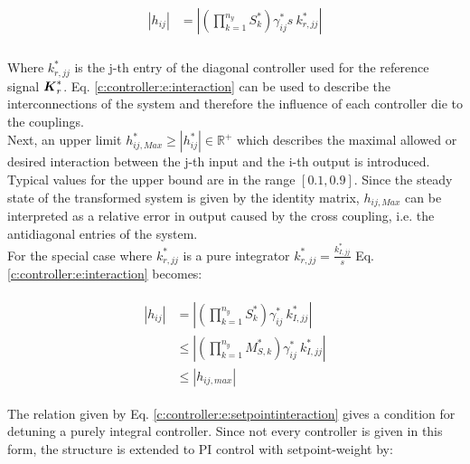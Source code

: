 \begin{align}
\begin{split}
|h_{ij}| &= \left|\left(\prod_{k = 1}^{n_y} S_{k}^*\right)\gamma_{ij}^*s ~k^*_{r,jj} \right| \\
\end{split}
\label{c:controller:e:interaction}
\end{align}

Where $k^*_{r,jj}$ is the j-th entry of the diagonal controller used for the reference signal $\mbox{\boldmath$K$}_r^*$. Eq. \ref{c:controller:e:interaction} can be used to describe the interconnections of the system and therefore the influence of each controller die to the couplings.\\

Next, an upper limit $h_{ij,Max}^* \geq |h_{ij}^*| \in \mathbb{R}^+$ which describes the maximal allowed or desired interaction between the j-th input and the i-th output is introduced. Typical values for the upper bound are in the range $\left[0.1, 0.9\right]$. Since the steady state of the transformed system is given by the identity matrix, $h_{ij,Max}$ can be interpreted as a relative error in output caused by the cross coupling, i.e. the antidiagonal entries of the system. \\

For the special case where $k^*_{r,jj}$ is a pure integrator $k_{r,jj}^* = \frac{k_{I,jj}^*}{s}$ Eq. \ref{c:controller:e:interaction} becomes:

\begin{align}
\begin{split}
\left| h_{ij} \right| &= \left|\left(\prod_{k = 1}^{n_y} S_k^*\right) \gamma^*_{ij}~ k^*_{I,jj} \right| \\
& \leq \left|\left(\prod_{k = 1}^{n_y} M_{S,k}^*\right) \gamma^*_{ij}~ k^*_{I,jj} \right| \\
& \leq \left|h_{ij,max}\right|
\end{split}
\label{c:controller:e:setpointinteraction}
\end{align}

The relation given by Eq. \ref{c:controller:e:setpointinteraction} gives a condition for detuning a purely integral controller. Since not every controller is given in this form, the structure is extended to PI control with setpoint-weight by:

